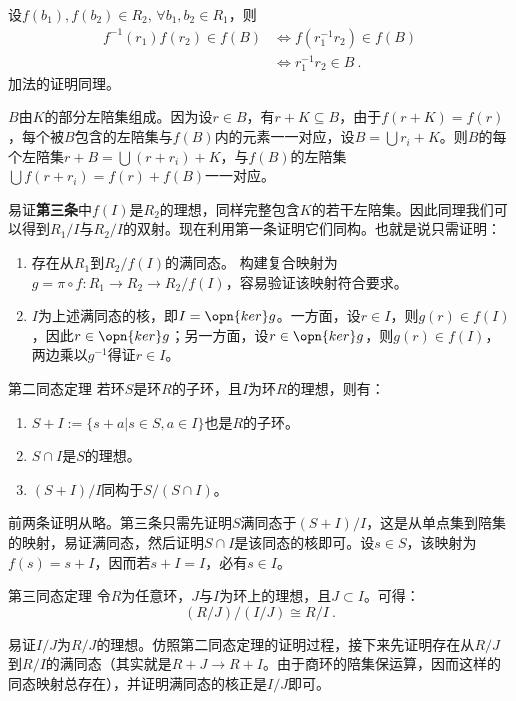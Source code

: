 设$f(b_1),f(b_2)\in R_2,\,\forall b_1,b_2\in R_1$，则
\begin{equation}
\begin{aligned}
f^{-1}(r_1)f(r_2)\in f(B)&\Leftrightarrow f(r_1^{-1}r_2)\in f(B)\\
&\Leftrightarrow r_1^{-1}r_2\in B~.
\end{aligned}
\end{equation}
加法的证明同理。

$B$由$K$的部分左陪集组成。因为设$r\in B$，有$r+K\subseteq B$，由于$f(r+K)=f(r)$，每个被$B$包含的左陪集与$f(B)$内的元素一一对应，设$B=\bigcup r_i+K$。则$B$的每个左陪集$r+B=\bigcup (r+r_i)+K$，与$f(B)$的左陪集$\bigcup f(r+r_i)=f(r)+f(B)$一一对应。

易证\textbf{第三条}中$f(I)$是$R_2$的理想，同样完整包含$K$的若干左陪集。因此同理我们可以得到$R_1/I$与$R_2/I$的双射。现在利用第一条证明它们同构。也就是说只需证明：
\begin{enumerate}
\item 存在从$R_1$到$R_2/f(I)$的满同态。
构建复合映射为$g=\pi\circ f:R_1\rightarrow R_2\rightarrow R_2/f(I)$，容易验证该映射符合要求。
\item $I$为上述满同态的核，即$I=\opn{ker}g$。一方面，设$r\in I$，则$g(r)\in f(I)$，因此$r\in \opn{ker}g$；另一方面，设$r\in \opn{ker}g$，则$g(r)\in f(I)$，两边乘以$g^{-1}$得证$r\in I$。
\end{enumerate}
\begin{theorem}{第二同态定理}
若环$S$是环$R$的子环，且$I$为环$R$的理想，则有：
\begin{enumerate}
\item $S+I:=\{s+a|s\in S,a\in I\}$也是$R$的子环。
\item $S\cap I$是$S$的理想。
\item $(S+I)/I$同构于$S/(S\cap I)$。
\end{enumerate}
\end{theorem}
前两条证明从略。第三条只需先证明$S$满同态于$(S+I)/I$，这是从单点集到陪集的映射，易证满同态，然后证明$S\cap I$是该同态的核即可。设$s\in S$，该映射为$f(s)=s+I$，因而若$s+I=I$，必有$s\in I$。
\begin{theorem}{第三同态定理}
令$R$为任意环，$J$与$I$为环上的理想，且$J\subset I$。可得：
\begin{equation}
(R/J)/(I/J)\cong R/I~.
\end{equation}
\end{theorem}
易证$I/J$为$R/J$的理想。仿照第二同态定理的证明过程，接下来先证明存在从$R/J$到$R/I$的满同态（其实就是$R+J\rightarrow R+I$。由于商环的陪集保运算，因而这样的同态映射总存在），并证明满同态的核正是$I/J$即可。



